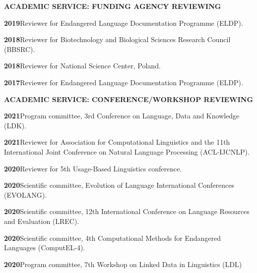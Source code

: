 \documentclass[11pt]{article}
\newcommand{\hangpara}{
 \setlength{\parindent}{0in} %
 \hangindent=0.42in %
}
\begin{document}
\vskip 20pt
\begin{flushleft}
{\bf ACADEMIC SERVICE: FUNDING AGENCY REVIEWING}
\end{flushleft}

\hangpara
{\bf 2019}\hspace{1ex}Reviewer for Endangered Language Documentation Programme (ELDP).

\vskip 6pt
\hangpara
{\bf 2018}\hspace{1ex}Reviewer for Biotechnology and Biological Sciences Research Council (BBSRC).

\vskip 6pt
\hangpara
{\bf 2018}\hspace{1ex}Reviewer for National Science Center, Poland.

\vskip 6pt
\hangpara
{\bf 2017}\hspace{1ex}Reviewer for Endangered Language Documentation Programme (ELDP).

\clearpage

\vskip 20pt
\begin{flushleft}
{\bf ACADEMIC SERVICE: CONFERENCE/WORKSHOP REVIEWING}
\end{flushleft}


\hangpara
{\bf 2021}\hspace{1ex}Program committee, 3rd Conference on Language, Data and Knowledge (LDK).

\hangpara
\vskip 6pt
{\bf 2021}\hspace{1ex}Reviewer for Association for Computational Linguistics and the 11th International Joint Conference on Natural Language Processing (ACL-IJCNLP).

\vskip 6pt
\hangpara
{\bf 2020}\hspace{1ex}Reviewer for 5th Usage-Based Linguistics conference.

\vskip 6pt
\hangpara
{\bf 2020}\hspace{1ex}Scientific committee, Evolution of Language International Conferences (EVOLANG).

\vskip 6pt
\hangpara
{\bf 2020}\hspace{1ex}Scientific committee, 12th International Conference on Language Resources and Evaluation (LREC).

\vskip 6pt
\hangpara
{\bf 2020}\hspace{1ex}Scientific committee, 4th Computational Methods for Endangered Languages (ComputEL-4).

\vskip 6pt
\hangpara
{\bf 2020}\hspace{1ex}Program committee, 7th Workshop on Linked Data in Linguistics (LDL)
\end{document}
